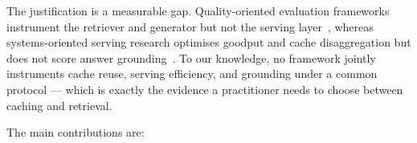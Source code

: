 


The justification is a measurable gap. Quality-oriented evaluation frameworks
instrument the retriever and generator but not the serving
layer~\cite{espejel2023ragas, ares2024, li2024ragbench}, whereas systems-oriented
serving research optimises goodput and cache disaggregation but does not score
answer grounding~\cite{zhong2024distserve, qin2024mooncake}. To our knowledge, no
framework jointly instruments cache reuse, serving efficiency, and grounding under a
common protocol --- which is exactly the evidence a practitioner needs to choose
between caching and retrieval.




The main contributions are:

